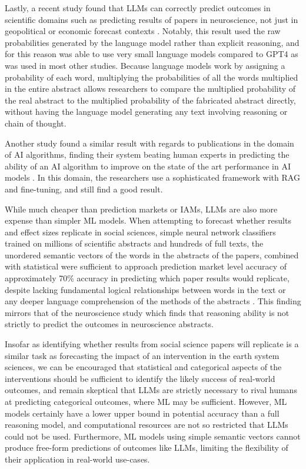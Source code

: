 \documentclass[12pt,a4paper]{article}
\begin{document}
Lastly, a recent study found that LLMs can correctly predict outcomes in scientific domains such as predicting results of papers in neuroscience, not just in geopolitical or economic forecast contexts . Notably, this result used the raw probabilities generated by the language model rather than explicit reasoning, and for this reason was able to use very small language models compared to GPT4 as was used in most other studies. Because language models work by assigning a probability of each word,  multiplying the probabilities of all the words multiplied in the entire abstract allows researchers to compare the multiplied probability of the real abstract to the multiplied probability of the fabricated abstract directly, without having the language model generating any text involving reasoning or chain of thought. 

Another study found a similar result with regards to publications in the domain of AI algorithms, finding their system beating human experts in predicting the ability of an AI algorithm to improve on the state of the art performance in AI models . In this domain, the researchers use a sophisticated framework with RAG and fine-tuning, and still find a good result.

While much cheaper than prediction markets or IAMs, LLMs are also more expense than simpler ML models. When attempting to forecast whether results and effect sizes replicate in social sciences, simple neural network classifiers trained on millions of scientific abstracts and hundreds of full texts, the unordered semantic vectors of the words in the abstracts of the papers, combined with statistical  were sufficient to approach prediction market level accuracy of approximately 70\% accuracy in predicting which paper results would replicate, despite lacking fundamental logical relationships between words in the text or any deeper language comprehension of the methods of the abstracts . This finding mirrors that of the neuroscience study  which finds that reasoning  ability is not strictly to predict the outcomes in neuroscience abstracts. 

Insofar as identifying whether results from social science papers will replicate is a similar task as forecasting the impact of an intervention in the earth system sciences, we can be encouraged that statistical and categorical aspects of the interventions should be sufficient to identify the likely success of real-world outcomes, and remain skeptical that LLMs are strictly necessary to rival humans at predicting categorical outcomes, where ML may be sufficient. However, ML models certainly have a lower upper bound in potential accuracy than a full reasoning model, and computational resources are not so restricted that LLMs could not be used. Furthermore, ML models using simple semantic vectors cannot produce free-form predictions of outcomes like LLMs, limiting the flexibility of their application in real-world use-cases.
\end{document}
